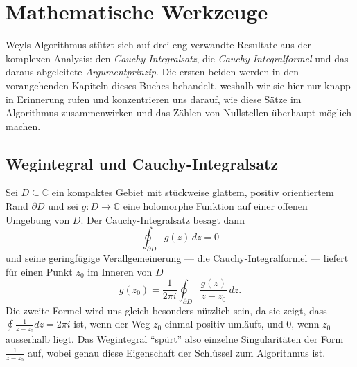 %
%
%
%
%
\section{Mathematische Werkzeuge%
\label{weyl:section:grundlagen}}
Weyls Algorithmus stützt sich auf drei eng verwandte Resultate aus der komplexen
Analysis: den \emph{Cauchy-Integralsatz}, die \emph{Cauchy-Integralformel}
und das daraus abgeleitete \emph{Argumentprinzip}.
Die ersten beiden werden in den vorangehenden Kapiteln dieses Buches 
behandelt, weshalb wir sie hier nur knapp in Erinnerung rufen und konzentrieren uns darauf,
wie diese Sätze im Algorithmus zusammenwirken und das Zählen von Nullstellen
überhaupt möglich machen.

\subsection{Wegintegral und Cauchy-Integralsatz%
\label{weyl:subsection:cauchy}}
Sei $D \subseteq \mathbb{C}$ ein kompaktes Gebiet mit stückweise glattem,
positiv orientiertem Rand $\partial D$ und sei $g\colon D \to \mathbb{C}$ eine
holomorphe Funktion auf einer offenen Umgebung von $D$.
Der Cauchy-Integralsatz besagt dann
%
\begin{equation}
\oint_{\partial D} g(z)\, dz
=
0
\label{weyl:eq:cauchy-integralsatz}
\end{equation}
und seine geringfügige Verallgemeinerung --- die Cauchy-Integralformel --- liefert
%
für einen Punkt $z_0$ im Inneren von $D$
\begin{equation}
g(z_0)
=
\frac{1}{2\pi i}
\oint_{\partial D}
\frac{g(z)}{z - z_0}
\, dz
.
\label{weyl:eq:cauchy-integralformel}
\end{equation}
Die zweite Formel wird uns gleich besonders nützlich sein, da sie zeigt, dass
$\oint \frac{1}{z - z_0} dz = 2\pi i$ ist, wenn der Weg $z_0$ einmal positiv umläuft, und
$0$, wenn $z_0$ ausserhalb liegt.
Das Wegintegral ``spürt'' also einzelne Singularitäten der Form $\frac{1}{z - z_0}$
auf, wobei genau diese Eigenschaft der Schlüssel zum Algorithmus ist.

